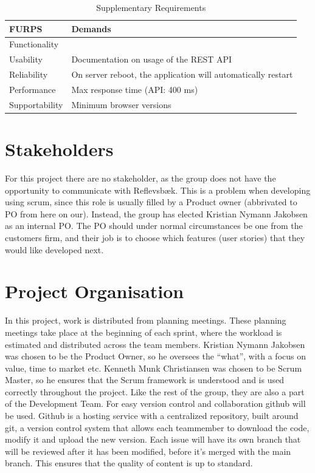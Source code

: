 \begin{table}[ht]
    \begin{tabularx}{\textwidth}{|>{\RaggedRight}p{4cm}|>{\RaggedRight}X|}
        \hline
        \textbf{FURPS}  & \textbf{Demands} \\
        \hline
        Functionality  	&  \\
        \hline
        Usability      	& Documentation on usage of the REST API \\
        \hline
        Reliability    	& On server reboot, the application will automatically restart \\
        \hline
        Performance    	& Max response time (API: 400 ms) \\
        \hline
        Supportability 	& Minimum browser versions \\
        \hline
    \end{tabularx}
    \caption{Supplementary Requirements} 
    \label{table:Sup_requirements}
\end{table} 

\section{Stakeholders}
For this project there are no stakeholder, as the group does not have the
opportunity to communicate with Reflevsbæk. This is a problem when developing
using scrum, since this role is usually filled by a Product owner (abbrivated
to PO from here on our). Instead, the group has elected Kristian Nymann 
Jakobsen as an internal PO. The PO should under normal circumstances be one
from the customers firm, and their job is to choose which features (user
stories) that they would like developed next.

\section{Project Organisation}
In this project, work is distributed from planning meetings. These planning
meetings take place at the beginning of each sprint, where the workload is
estimated and distributed across the team members. Kristian Nymann Jakobsen was chosen to be the
Product Owner, so he oversees the “what”, with a focus on value, time to market
etc. Kenneth Munk Christiansen was chosen to be Scrum Master, so he ensures that the Scrum
framework is understood and is used correctly throughout the project. Like the
rest of the group, they are also a part of the Development Team.
For easy version control and collaboration github will be used. Github is a hosting service with a centralized
repository, built around git, a version control system that allows each teammember to download the code, 
modify it and upload the new version. Each issue will have its own branch that will be reviewed 
after it has been modified, before it's merged with the main branch. This ensures that the 
quality of content is up to standard.

